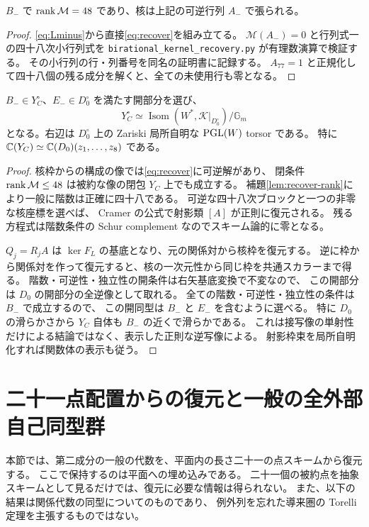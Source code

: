 \begin{lemma}\label{lem:recover-rank}
$B_-$ で $\operatorname{rank}\mathcal M=48$ であり、核は上記の可逆行列 $A_-$ で張られる。
\end{lemma}
\begin{proof}
\eqref{eq:Lminus}から直接\eqref{eq:recover}を組み立てる。
$\mathcal M(A_-)=0$ と行列式一の四十八次小行列式を
\nolinkurl{birational_kernel_recovery.py} が有理数演算で検証する。
その小行列の行・列番号を同名の証明書に記録する。
$A_{77}=1$ と正規化して四十八個の残る成分を解くと、全ての未使用行も零となる。
\end{proof}

\begin{proposition}[射影的な核枠による開同型]\label{prop:right-torsor}
$B_-\in Y_C^\circ$、$E_-\in D_0^\circ$ を満たす開部分を選び、
\[
 Y_C^\circ\simeq
 \operatorname{Isom}(W^*,\mathscr K|_{D_0^\circ})/\mathbb G_m
\]
となる。右辺は $D_0^\circ$ 上の Zariski 局所自明な $\operatorname{PGL}(W)$ torsor である。
特に $\mathbb C(Y_C)\simeq\mathbb C(D_0)(z_1,\ldots,z_8)$ である。
\end{proposition}
\begin{proof}
核枠からの構成の像では\eqref{eq:recover}に可逆解があり、
閉条件 $\operatorname{rank}\mathcal M\le48$ は被約な像の閉包 $Y_C$ 上でも成立する。
補題\ref{lem:recover-rank}により一般に階数は正確に四十八である。
可逆な四十八次ブロックと一つの非零な核座標を選べば、
Cramer の公式で射影類 $[A]$ が正則に復元される。
残る方程式は階数条件の Schur complement なのでスキーム論的に零となる。

$Q_j=R_jA$ は $\ker F_L$ の基底となり、元の関係対から核枠を復元する。
逆に枠から関係対を作って復元すると、核の一次元性から同じ枠を共通スカラーまで得る。
階数・可逆性・独立性の開条件は右矢基底変換で不変なので、
この開部分は $D_0$ の開部分の全逆像として取れる。
全ての階数・可逆性・独立性の条件は $B_-$ で成立するので、
この開同型は $B_-$ と $E_-$ を含むように選べる。
特に $D_0$ の滑らかさから $Y_C$ 自体も $B_-$ の近くで滑らかである。
これは接写像の単射性だけによる結論ではなく、表示した正則な逆写像による。
射影枠束を局所自明化すれば関数体の表示も従う。
\end{proof}

\section{二十一点配置からの復元と一般の全外部自己同型群}
\label{sec:point-configuration-torelli-v23}

本節では、第二成分の一般の代数を、平面内の長さ二十一の点スキームから復元する。
ここで保持するのは平面への埋め込みである。
二十一個の被約点を抽象スキームとして見るだけでは、復元に必要な情報は得られない。
また、以下の結果は関係代数の同型についてのものであり、
例外列を忘れた導来圏の Torelli 定理を主張するものではない。

